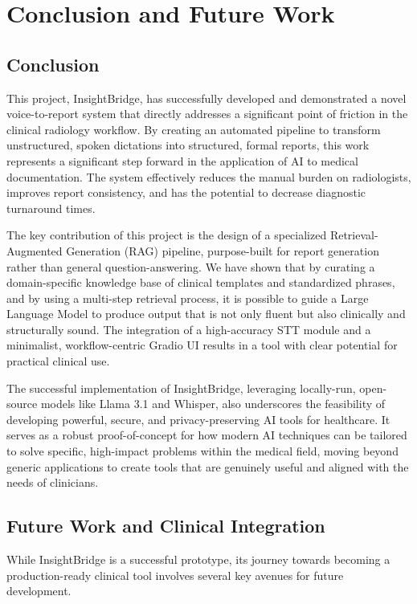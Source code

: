 \chapter{Conclusion and Future Work}
\label{cha:conclusion}

\section{Conclusion}

This project, InsightBridge, has successfully developed and demonstrated a novel voice-to-report system that directly addresses a significant point of friction in the clinical radiology workflow. By creating an automated pipeline to transform unstructured, spoken dictations into structured, formal reports, this work represents a significant step forward in the application of AI to medical documentation. The system effectively reduces the manual burden on radiologists, improves report consistency, and has the potential to decrease diagnostic turnaround times.

The key contribution of this project is the design of a specialized Retrieval-Augmented Generation (RAG) pipeline, purpose-built for report generation rather than general question-answering. We have shown that by curating a domain-specific knowledge base of clinical templates and standardized phrases, and by using a multi-step retrieval process, it is possible to guide a Large Language Model to produce output that is not only fluent but also clinically and structurally sound. The integration of a high-accuracy STT module and a minimalist, workflow-centric Gradio UI results in a tool with clear potential for practical clinical use.

The successful implementation of InsightBridge, leveraging locally-run, open-source models like Llama 3.1 and Whisper, also underscores the feasibility of developing powerful, secure, and privacy-preserving AI tools for healthcare. It serves as a robust proof-of-concept for how modern AI techniques can be tailored to solve specific, high-impact problems within the medical field, moving beyond generic applications to create tools that are genuinely useful and aligned with the needs of clinicians.

\section{Future Work and Clinical Integration}

While InsightBridge is a successful prototype, its journey towards becoming a production-ready clinical tool involves several key avenues for future development.


